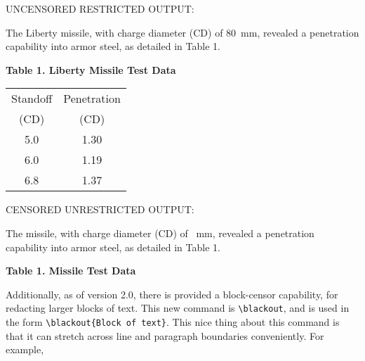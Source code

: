 \documentclass{article}
\begin{document}
{\addtolength{\leftskip}{2.3em}
UNCENSORED RESTRICTED OUTPUT: \hrulefill

The Liberty missile, with charge diameter (CD) of
80~mm, revealed a penetration capability into armor steel, as detailed
in Table 1.

\begin{table}[ht]
\begin{center}
\textbf{Table 1. Liberty Missile Test Data}\\
\small\begin{tabular}{cc}
Standoff & Penetration \\
(CD) & (CD) \\
\hline
 5.0 & 1.30 \\
 6.0 & 1.19 \\
 6.8 & 1.37\\
\end{tabular}
\end{center}
\end{table}

\clearpage CENSORED UNRESTRICTED OUTPUT: \hrulefill

The  missile, with charge diameter (CD) of
~mm, revealed a penetration capability into armor steel, as
detailed in Table 1.

\begin{table}[ht]
\begin{center}
\textbf{Table 1.  Missile Test Data}\\
\end{center}
\end{table}
\par
\hrulefill

}

Additionally, as of version 2.0, there is provided a block-censor
capability, for redacting larger blocks of text.  This new command
is \verb|\blackout|, and is used in the form 
\verb|\blackout{Block of text}|.  This nice thing about this command is
that it can stretch across line and paragraph boundaries conveniently.
For example,
\end{document}
